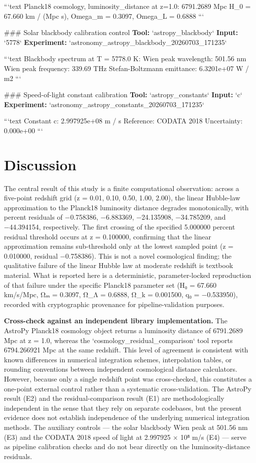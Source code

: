 \documentclass[11pt,a4paper]{article}
\begin{document}
```text
Planck18 cosmology, luminosity\_distance at z=1.0:
  6791.2689 Mpc
  H\_0 = 67.660 km / (Mpc s), Omega\_m = 0.3097, Omega\_L = 0.6888
```

\#\#\# Solar blackbody calibration control
\textbf{Tool:} `astropy\_blackbody`
\textbf{Input:} `5778`
\textbf{Experiment:} `astronomy\_astropy\_blackbody\_20260703\_171235`

```text
Blackbody spectrum at T = 5778.0 K:
  Wien peak wavelength: 501.56 nm
  Wien peak frequency: 339.69 THz
  Stefan-Boltzmann emittance: 6.3201e+07 W / m2
```

\#\#\# Speed-of-light constant calibration
\textbf{Tool:} `astropy\_constants`
\textbf{Input:} `c`
\textbf{Experiment:} `astronomy\_astropy\_constants\_20260703\_171235`

```text
Constant c: 2.997925e+08 m / s
Reference: CODATA 2018
Uncertainty: 0.000e+00
```


\section{Discussion}
The central result of this study is a finite computational observation: across a five-point redshift grid (z = 0.01, 0.10, 0.50, 1.00, 2.00), the linear Hubble-law approximation to the Planck18 luminosity distance degrades monotonically, with percent residuals of −0.758386, −6.883369, −24.135908, −34.785209, and −44.394154, respectively. The first crossing of the specified 5.000000 percent residual threshold occurs at z = 0.100000, confirming that the linear approximation remains sub-threshold only at the lowest sampled point (z = 0.010000, residual −0.758386). This is not a novel cosmological finding; the qualitative failure of the linear Hubble law at moderate redshift is textbook material. What is reported here is a deterministic, parameter-locked reproduction of that failure under the specific Planck18 parameter set (H₀ = 67.660 km/s/Mpc, Ωₘ = 0.3097, Ω\_Λ = 0.6888, Ω\_k = 0.001500, q₀ = −0.533950), recorded with cryptographic provenance for pipeline-validation purposes.

\textbf{Cross-check against an independent library implementation.} The AstroPy Planck18 cosmology object returns a luminosity distance of 6791.2689 Mpc at z = 1.0, whereas the `cosmology\_residual\_comparison` tool reports 6794.266921 Mpc at the same redshift. This level of agreement is consistent with known differences in numerical integration schemes, interpolation tables, or rounding conventions between independent cosmological distance calculators. However, because only a single redshift point was cross-checked, this constitutes a one-point external control rather than a systematic cross-validation. The AstroPy result (E2) and the residual-comparison result (E1) are methodologically independent in the sense that they rely on separate codebases, but the present evidence does not establish independence of the underlying numerical integration methods. The auxiliary controls — the solar blackbody Wien peak at 501.56 nm (E3) and the CODATA 2018 speed of light at 2.997925 × 10⁸ m/s (E4) — serve as pipeline calibration checks and do not bear directly on the luminosity-distance residuals.
\end{document}
